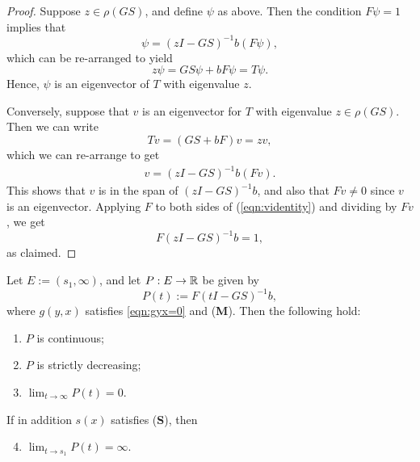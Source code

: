 \begin{proof}
	Suppose $z \in \rho(GS)$, and define $\psi$ as above. Then the condition $F\psi = 1$ implies that
	\[\psi = (z I - GS)^{-1} b (F \psi),\]
	which can be re-arranged to yield
	\[z \psi = GS \psi + bF \psi = T \psi.\]
	Hence, $\psi$ is an eigenvector of $T$ with eigenvalue $z$.
	
	Conversely, suppose that $v$ is an eigenvector for $T$ with eigenvalue $z \in \rho(GS)$. Then we can write
	\[T v = (GS + bF)v = z v,\]
	which we can re-arrange to get
	\begin{align}
		v = (z I - GS)^{-1} b (F v). \label{eqn:videntity}
	\end{align}
	This shows that $v$ is in the span of $(z I - GS)^{-1}b$, and also that $F v \neq 0$ since $v$ is an eigenvector. Applying $F$ to both sides of (\ref{eqn:videntity}) and dividing by $F v$, we get
	\[F(z I - GS)^{-1}b = 1,\]
	as claimed.
	
\end{proof}

\begin{lemma} \label{th:Pmufacts}
	Let $E:= (s_1, \infty)$, and let $P:E \to \mathbb{R}$ be given by
	\[P(t):= F(t I-GS)^{-1}b,\]
	where $g(y,x)$ satisfies \eqref{eqn:gyx=0} and (\textbf{M}). Then the following hold:
	\begin{enumerate}
		\item $P$ is continuous; \label{continuous}
		\item $P$ is strictly decreasing; \label{decreasing}
		\item $\lim_{t \to \infty} P(t) = 0$. \label{ptozero}
	\end{enumerate}
	If in addition $s(x)$ satisfies (\textbf{S}), then
	\begin{enumerate}
		\setcounter{enumi}{3}
		\item $\lim_{t \to s_1} P(t) = \infty$. \label{ptoinfty}
	\end{enumerate}
\end{lemma}


